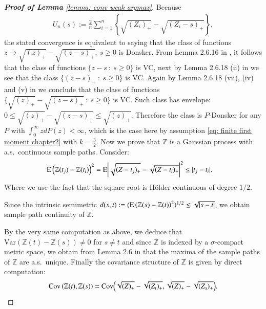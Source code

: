 \begin{proof}[\hypertarget{proof of lemma weak conv}{\textbf{Proof of Lemma}} \ref{lemma: conv weak argmax}]
Because
\begin{align*}
    U_n(s) := \frac{2}{n} \sum_{i=1}^n \left\{ \sqrt{(Z_i)_{+}} - \sqrt{(Z_i-s)_{+}} \right\}, 
\end{align*}
the stated convergence is equivalent to saying that the class of functions $z \rightarrow \sqrt{(z)_{+}} - \sqrt{(z-s)_{+}}, \: s \geq 0$ is Donsker. From Lemma 2.6.16 in \cite{5}, it follows that the class of functions $\{ z- s \: : \: s \geq 0 \}$ is VC, next by Lemma 2.6.18 (ii) in \cite{5} we see that the class $\{ (z -s)_{+} \: : \: s \geq 0 \}$ is VC. Again by Lemma 2.6.18 (vii), (iv) and (v) in \cite{5} we conclude that the class of functions $\{ \sqrt{(z)_{+}} - \sqrt{(z-s)_{+}} \: : \: s \geq 0 \}$ is VC. Such class has envelope: $0 \leq \sqrt{(z)_{+}} - \sqrt{(z-s)_{+}} \leq \sqrt{(z)_{+}}$. Therefore the class is $P$-Donsker for any $P$ with $\int_{0}^{\infty} z dP(z) < \infty$, which is the case here by assumption \eqref{eq: finite first moment chapter2} with $k = \frac{3}{2}$.
Now we prove that $\mathbb{Z}$ is a Gaussian process with a.s.\ continuous sample paths. Consider:
\begin{align*}
    &\mathrm{E} \left( \mathbb{Z} (t_j) - \mathbb{Z} (t_i) \right)^2 =  \mathrm{E}  \bigg|\sqrt{(Z - t_j)_{+}} - \sqrt{(Z - t_i)_{+}} \bigg|^2  \leq |t_j - t_i|.
\end{align*}
Where we use the fact that the square root is Hölder continuous of degree $1/2$. 

Since the intrinsic semimetric $d (s,t) := (\mathrm{E} \left( \mathbb{Z} (s) - \mathbb{Z} (t) \right)^2)^{1/2} \leq \sqrt{|s-t|}$, we obtain sample path continuity of $\mathbb{Z}$. 

By the very same computation as above, we deduce that $\mathrm{Var}(\mathbb{Z}(t) - \mathbb{Z}(s)) \neq 0$ for $s \neq t$ and since $\mathbb{Z}$ is indexed by a $\sigma$-compact metric space, we obtain from Lemma 2.6 in \cite{12} that the maxima of the sample paths of $\mathbb{Z}$ are a.s.\ unique. Finally the covariance structure of $\mathbb{Z}$ is given by direct computation:
\begin{align*}
    \mathrm{Cov} \left( \mathbb{Z}(t),\mathbb{Z}(s) \right) = \mathrm{Cov} \Big( \sqrt{\smash[b]{(Z)_{+}}} - \sqrt{\smash[b]{(Z_t)_{+}}}, \sqrt{\smash[b]{(Z)_{+}}} - \sqrt{\smash[b]{(Z_s)_{+}}} \Big).
\end{align*}
\end{proof}

